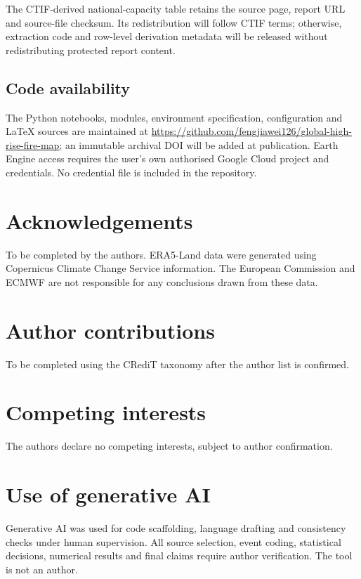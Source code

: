 \documentclass[11pt]{article}
\begin{document}
The CTIF-derived national-capacity table retains the source page, report URL and source-file checksum. Its redistribution will follow CTIF terms; otherwise, extraction code and row-level derivation metadata will be released without redistributing protected report content.

\subsection*{Code availability}
The Python notebooks, modules, environment specification, configuration and LaTeX sources are maintained at \url{https://github.com/fengjiawei126/global-high-rise-fire-map}; an immutable archival DOI will be added at publication. Earth Engine access requires the user's own authorised Google Cloud project and credentials. No credential file is included in the repository.

\section*{Acknowledgements}
To be completed by the authors. ERA5-Land data were generated using Copernicus Climate Change Service information. The European Commission and ECMWF are not responsible for any conclusions drawn from these data.

\section*{Author contributions}
To be completed using the CRediT taxonomy after the author list is confirmed.

\section*{Competing interests}
The authors declare no competing interests, subject to author confirmation.

\section*{Use of generative AI}
Generative AI was used for code scaffolding, language drafting and consistency checks under human supervision. All source selection, event coding, statistical decisions, numerical results and final claims require author verification. The tool is not an author.



\end{document}
